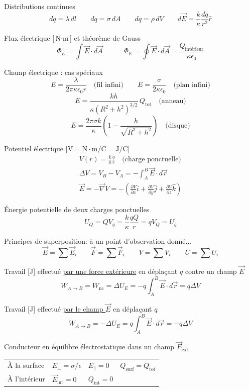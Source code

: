 \documentclass[10pt,landscape]{article}
\newcommand{\halfline}{\vspace{0.5em}}
\newcommand{\tableindent}{\hspace{1.5em}}
\newcommand{\uvec}[1]{\ensuremath{{\hat{#1}}}}
\begin{document}
\begin{multicols}{3}
Distributions continues
\[ dq = \lambda\, dl
\qquad
dq = \sigma\, dA
\qquad 
dq = \rho\, dV
 \qquad
 d\vec{E} = \frac{k}{\kappa} \frac{dq}{r^2 }  \uvec{r} \]

Flux électrique [$\si{\newton\cdot\metre}$] et théorème de Gauss
\[ 
\Phi_E = \int \vec{E}\cdot d\vec{A}
\qquad\quad
\Phi_E = \oint \vec{E}\cdot d\vec{A} = \frac{Q_\text{intérieur}}{\kappa \epsilon_0} \]

Champ électrique : cas spéciaux
\[ E =  \frac{\lambda}{2\pi\kappa\epsilon_0  r} \quad\text{(fil infini)} \qquad
 E = \frac{\sigma}{2\kappa\epsilon_0} \quad\text{(plan infini)} \]
\[ E =  \frac{kh}{\kappa (R^2 + h^2)^{3/2}} \, Q_\text{tot}  \quad\text{(anneau)} \]
\[ E = \frac{2\pi\sigma  k}{\kappa}\left( 1- \frac{h}{\sqrt{R^2+h^2}} \right) \quad\text{(disque)} \]

Potentiel électrique [$\si{\volt} = \si{\newton\cdot\metre/\coulomb} = \si{\joule/\coulomb}$]
\begin{gather*}
	V(r) = \frac{k}{\kappa}  \frac{q}{r } \quad \text{(charge ponctuelle)} \\
	\Delta V = V_B - V_A  = -\int_A^B \vec{E}\cdot d\vec{r} \\
	 \vec{E} = -\vec\nabla V = - \left( \frac{\partial V}{\partial x}\uvec{i} + \frac{\partial V}{\partial y}\uvec{j} + \frac{\partial V}{\partial z}\uvec{k} \right) 
\end{gather*}

Énergie potentielle de deux charges ponctuelles
\[ U_Q = QV_q = \frac{k}{\kappa} \frac{qQ}{r} = qV_Q = U_q\]

Principes de superposition: à un point d'observation donné...
\[ \vec{E} = \sum \vec{E}_i 
\qquad \vec{F} = \sum \vec{F}_i 
\qquad V = \sum {V}_i 
\qquad U = \sum {U}_i \]

Travail [\si{\joule}] effectué \underline{par une force extérieure} en déplaçant $q$ contre un champ $\vec{E}$
\[ W_{A\to B} = W_\text{nc} = \Delta U_E = -q\int_{A}^{B} \vec{E}\cdot d\vec{r} = q\Delta V \]

Travail [\si{\joule}] effectué \underline{par le champ $\vec{E}$} en déplaçant $q$ 
\[ W_{A\to B} =  -\Delta U_E = q\int_{A}^{B} \vec{E}\cdot d\vec{r} =- q\Delta V \]

Conducteur  en équilibre électrostatique dans un champ $\vec{E}_\text{ext}$ \\
\halfline
\begin{tabular}{@{\tableindent}llll@{}}
	À la surface & $ E_\perp = {\sigma}/{\epsilon}$ & $E_\parallel = 0 $ & $Q_\text{surf} = Q_\text{tot} $\\
	À l'intérieur  & $\vec{E}_\text{int} = 0 $ &  $Q_\text{int} = 0 $ & \\
\end{tabular}
\halfline


\end{multicols}
\end{document}
